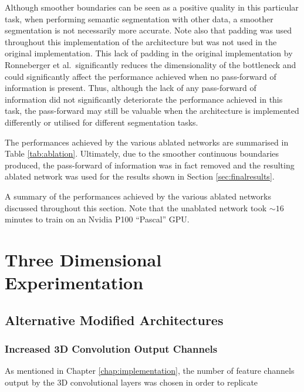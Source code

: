 Although smoother boundaries can be seen as a positive quality in this particular task, when performing semantic segmentation with other data, a smoother segmentation is not necessarily more accurate. Note also that padding was used throughout this implementation of the architecture but was not used in the original implementation. This lack of padding in the original implementation by Ronneberger et al.\ significantly reduces the dimensionality of the bottleneck and could significantly affect the performance achieved when no pass-forward of information is present. Thus, although the lack of any pass-forward of information did not significantly deteriorate the performance achieved in this task, the pass-forward may still be valuable when the architecture is implemented differently or utilised for different segmentation tasks.

The performances achieved by the various ablated networks are summarised in Table \ref{tab:ablation}. Ultimately, due to the smoother continuous boundaries produced, the pass-forward of information was in fact removed and the resulting ablated network was used for the results shown in Section \ref{sec:finalresults}.

\begin{table}[!t]
    \centering
    \caption{A summary of the performances achieved by the various ablated networks discussed throughout this section. Note that the unablated network took ${\sim}16$ minutes to train on an Nvidia P100 ``Pascal'' GPU.}
    
    \label{tab:ablation}
\end{table}

\section{Three Dimensional Experimentation}

\subsection{Alternative Modified Architectures}

\subsubsection{Increased 3D Convolution Output Channels}

As mentioned in Chapter \ref{chap:implementation}, the number of feature channels output by the 3D convolutional layers was chosen in order to replicate 

